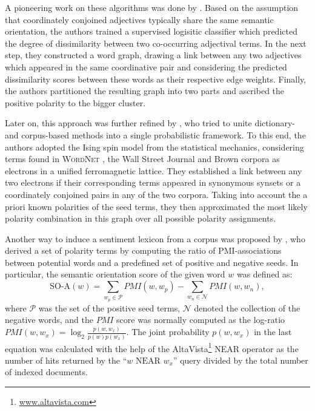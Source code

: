 A pioneering work on these algorithms was done by
\citet{Hatzivassi:97}.  Based on the assumption that coordinately
conjoined adjectives typically share the same semantic orientation,
the authors trained a supervised logisitic classifier which predicted
the degree of dissimilarity between two co-occurring adjectival terms.
In the next step, they constructed a word graph, drawing a link
between any two adjectives which appeared in the same coordinative
pair and considering the predicted dissimilarity scores between these
words as their respective edge weights.  Finally, the authors
partitioned the resulting graph into two parts and ascribed the
positive polarity to the bigger cluster.

Later on, this approach was further refined by \citet{Takamura:05},
who tried to unite dictionary- and corpus-based methods into a single
probabilistic framework.  To this end, the authors adopted the Ising
spin model from the statistical mechanics, considering terms found in
\textsc{WordNet} \cite{Miller:95}, the Wall Street Journal and Brown
corpora as electrons in a unified ferromagnetic lattice.  They
established a link between any two electrons if their corresponding
terms appeared in synonymous synsets or a coordinately conjoined pairs
in any of the two corpora.  Taking into account the a priori known
polarities of the seed terms, they then approximated the most likely
polarity combination in this graph over all possible polarity
assignments.

Another way to induce a sentiment lexicon from a corpus was proposed
by \citet{Turney:03}, who derived a set of polarity terms by computing
the ratio of PMI-associations between potential words and a predefined
set of positive and negative seeds.  In particular, the semantic
orientation score of the given word $w$ was defined as:
\begin{equation*}
  \textrm{SO-A}(w) = \sum_{w_p\in\mathcal{P}}PMI(w, w_p) - \sum_{w_n\in\mathcal{N}}PMI(w, w_n),
\end{equation*}
where $\mathcal{P}$ was the set of the positive seed terms,
$\mathcal{N}$ denoted the collection of the negative words, and the
$PMI$ score was normally computed as the log-ratio $PMI(w, w_x) =
\log_2\frac{p(w, w_x)}{p(w)p(w_x)}$.  The joint probability $p(w,
w_x)$ in the last equation was calculated with the help of the
AltaVista\footnote{\url{www.altavista.com}} NEAR operator as the
number of hits returned by the ``$w\textrm{ NEAR }w_x$'' query divided
by the total number of indexed documents.

